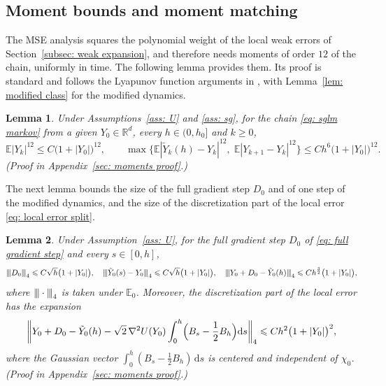 \documentclass{article}
\newtheorem{lemma}{Lemma}
\newcommand{\Le}{\leqslant}
\newcommand{\Ge}{\geqslant}
\newcommand{\D}{\mathrm{d}}
\newcommand{\pnorm}[1]{{\vert\kern-0.25ex\vert\kern-0.25ex\vert} #1 {\vert\kern-0.25ex\vert\kern-0.25ex\vert}}
\numberwithin{equation}{section}
\begin{document}
\subsection{Moment bounds and moment matching}
\label{subsec: bias cutoff}

The MSE analysis squares the polynomial weight of the local weak errors of Section~\ref{subsec: weak expansion}, and therefore needs moments of order $12$ of the chain, uniformly in time. The following lemma provides them. Its proof is standard and follows the Lyapunov function arguments in \citep{ye2026mse}, with Lemma~\ref{lem: modified class} for the modified dynamics.

\begin{lemma}
\label{lem: moments}
    Under Assumptions~\ref{ass: U} and \ref{ass: sg}, for the chain \eqref{eq: sglm markov} from a given $Y_0 \in \mathbb R^d$, every $h \in (0,h_0]$ and $k \Ge 0$,
    \begin{equation}
        \mathbb E |Y_k|^{12} \Le C \bigl( 1 + |Y_0| \bigr)^{12} , \qquad
        \max\bigl\{ \mathbb E |\tilde Y_k(h) - Y_k|^{12} ,\; \mathbb E |Y_{k+1} - Y_k|^{12} \bigr\} \Le C h^{6} \bigl( 1 + |Y_0| \bigr)^{12} .
        \label{eq: moment bounds}
    \end{equation}
    \emph{(Proof in Appendix~\ref{sec: moments proof}.)}
\end{lemma}

The next lemma bounds the size of the full gradient step $D_0$ and of one step of the modified dynamics, and the size of the discretization part of the local error \eqref{eq: local error split}.

\begin{lemma}
\label{lem: sizes}
    Under Assumption~\ref{ass: U}, for the full gradient step $D_0$ of \eqref{eq: full gradient step} and every $s \in [0,h]$,
    \begin{equation}
        \pnorm{D_0}_4 \Le C \sqrt h \bigl( 1 + |Y_0| \bigr) , \quad
        \pnorm{\tilde Y_0(s) - Y_0}_4 \Le C \sqrt h \bigl( 1 + |Y_0| \bigr) , \quad
        \pnorm{Y_0 + D_0 - \tilde Y_0(h)}_4 \Le C h^{\frac32} \bigl( 1 + |Y_0| \bigr) ,
        \label{eq: sizes}
    \end{equation}
    where $\pnorm{\cdot}_4$ is taken under $\mathbb E_0$. Moreover, the discretization part of the local error has the expansion
    \begin{equation}
        \biggl\| Y_0 + D_0 - \tilde Y_0(h) - \sqrt2\, \nabla^2 U(Y_0) \int_0^h \Bigl( B_s - \frac12 B_h \Bigr) \D s \biggr\|_4 \Le C h^2 \bigl( 1 + |Y_0| \bigr)^2 ,
        \label{eq: local error expansion}
    \end{equation}
    where the Gaussian vector $\int_0^h ( B_s - \frac12 B_h )\, \D s$ is centered and independent of $\chi_0$. \emph{(Proof in Appendix~\ref{sec: moments proof}.)}
\end{lemma}
\end{document}
